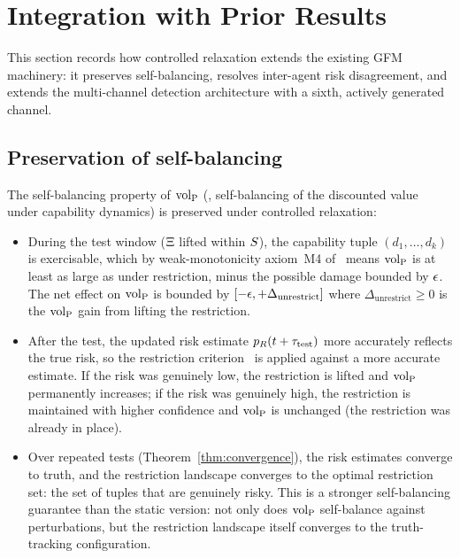 \section{Integration with Prior Results}
\label{sec:integration}

This section records how controlled relaxation extends the
existing GFM machinery: it preserves self-balancing, resolves
inter-agent risk disagreement, and extends the multi-channel
detection architecture with a sixth, actively generated channel.

\subsection{Preservation of self-balancing}

\begin{proposition}
\label{prop:preserve_balance}
The self-balancing property of ${\operatorname{vol}_{\mathrm{P}}}$
(\citep[Theorem~1]{lasser2026horizon}, self-balancing of the
discounted value under capability dynamics) is preserved under
controlled relaxation:
\begin{itemize}
\item[(a)] During the test window ($\Xi$ lifted within
  $S$), the capability tuple $(d_1, \ldots, d_k)$ is
  exercisable, which by weak-monotonicity axiom~M4
  of~\citep[Proposition~1]{lasser2026poset} means ${\operatorname{vol}_{\mathrm{P}}}$ is at
  least as large as under restriction, minus the possible
  damage bounded by $\epsilon$.  The net effect on ${\operatorname{vol}_{\mathrm{P}}}$
  is bounded by
  $[-\epsilon, +\Delta_{\mathrm{unrestrict}}]$ where
  $\Delta_{\mathrm{unrestrict}} \geq 0$ is the ${\operatorname{vol}_{\mathrm{P}}}$ gain from
  lifting the restriction.
\item[(b)] After the test, the updated risk estimate
  $p_R(t + \tau_{\mathrm{test}})$ more accurately reflects the true risk, so
  the restriction
  criterion~\citep[Proposition~1]{lasser2026horizon} is applied
  against a more accurate estimate.  If the risk was genuinely
  low, the restriction is lifted and ${\operatorname{vol}_{\mathrm{P}}}$ permanently
  increases; if the risk was genuinely high, the restriction is
  maintained with higher confidence and ${\operatorname{vol}_{\mathrm{P}}}$ is unchanged
  (the restriction was already in place).
\item[(c)] Over repeated tests
  (Theorem~\ref{thm:convergence}), the risk estimates converge
  to truth, and the restriction landscape converges to the
  optimal restriction set: the set of tuples that are
  genuinely risky.  This is a stronger self-balancing guarantee
  than the static version: not only does ${\operatorname{vol}_{\mathrm{P}}}$ self-balance
  against perturbations, but the restriction landscape itself
  converges to the truth-tracking configuration.
\end{itemize}
\end{proposition}

